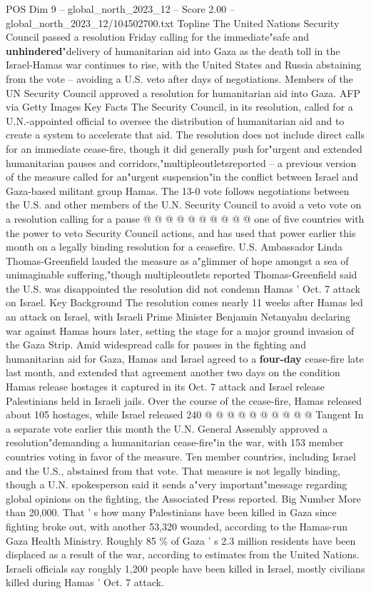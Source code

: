 \begin{textsample}{POS Dim 9 – global\_north\_2023\_12 – Score 2.00 – global\_north\_2023\_12/104502700.txt}  \label{ex:f9_pos_167}
Topline The United Nations Security Council passed a resolution Friday calling for the immediate"safe and \textbf{unhindered}"delivery of humanitarian aid into Gaza as the death toll in the Israel-Hamas war continues to rise, with the United States and Russia abstaining from the vote -- avoiding a U.S. veto after days of negotiations.
Members of the UN Security Council approved a resolution for humanitarian aid into Gaza.
AFP via Getty Images Key Facts The Security Council, in its resolution, called for a U.N.-appointed official to oversee the distribution of humanitarian aid and to create a system to accelerate that aid.
The resolution does not include direct calls for an immediate cease-fire, though it did generally push for"urgent and extended humanitarian pauses and corridors,"multipleoutletsreported -- a previous version of the measure called for an"urgent suspension"in the conflict between Israel and Gaza-based militant group Hamas.
The 13-0 vote follows negotiations between the U.S. and other members of the U.N.
Security Council to avoid a veto vote on a resolution calling for a pause @ @ @ @ @ @ @ @ @ @ one of five countries with the power to veto Security Council actions, and has used that power earlier this month on a legally binding resolution for a ceasefire.
U.S.
Ambassador Linda Thomas-Greenfield lauded the measure as a"glimmer of hope amongst a sea of unimaginable suffering,"though multipleoutlets reported Thomas-Greenfield said the U.S. was disappointed the resolution did not condemn Hamas ' Oct. 7 attack on Israel.
Key Background The resolution comes nearly 11 weeks after Hamas led an attack on Israel, with Israeli Prime Minister Benjamin Netanyahu declaring war against Hamas hours later, setting the stage for a major ground invasion of the Gaza Strip.
Amid widespread calls for pauses in the fighting and humanitarian aid for Gaza, Hamas and Israel agreed to a \textbf{four-day} cease-fire late last month, and extended that agreement another two days on the condition Hamas release hostages it captured in its Oct. 7 attack and Israel release Palestinians held in Israeli jails.
Over the course of the cease-fire, Hamas released about 105 hostages, while Israel released 240 @ @ @ @ @ @ @ @ @ @ Tangent In a separate vote earlier this month the U.N.
General Assembly approved a resolution"demanding a humanitarian cease-fire"in the war, with 153 member countries voting in favor of the measure.
Ten member countries, including Israel and the U.S., abstained from that vote.
That measure is not legally binding, though a U.N. spokesperson said it sends a"very important"message regarding global opinions on the fighting, the Associated Press reported.
Big Number More than 20,000.
That ' s how many Palestinians have been killed in Gaza since fighting broke out, with another 53,320 wounded, according to the Hamas-run Gaza Health Ministry.
Roughly 85 \% of Gaza ' s 2.3 million residents have been displaced as a result of the war, according to estimates from the United Nations.
Israeli officials say roughly 1,200 people have been killed in Israel, mostly civilians killed during Hamas ' Oct. 7 attack.

\end{textsample}
